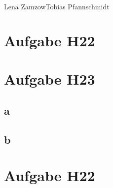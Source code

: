 \documentclass[11pt,a4paper]{article}
\begin{document}
                {Lena Zamzow}{Tobias Pfannschmidt}{}{}{}


\section*{Aufgabe H22}
\section*{Aufgabe H23}
\subsection*{a}
\subsection*{b}
\section*{Aufgabe H22}
\end{document}
